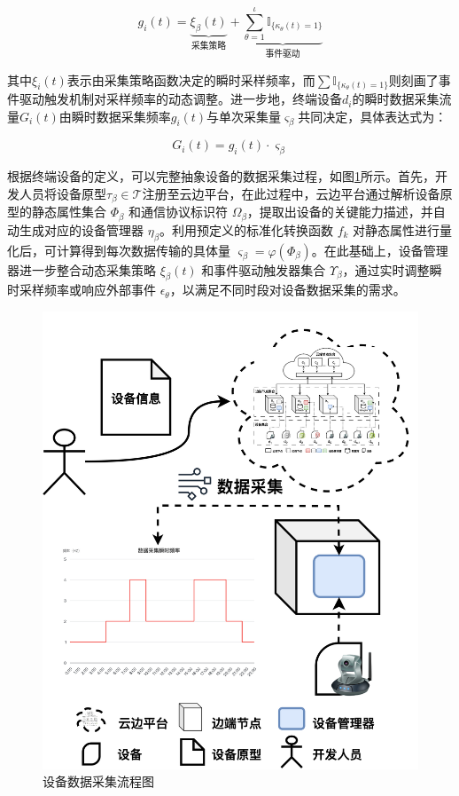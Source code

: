 \begin{equation}
g_i(t) = \underbrace{\xi_\beta(t)}_{\text{采集策略}} + \underbrace{\sum_{\theta=1}^{\iota} \mathbb{I}_{\{\kappa_\theta(t)=1\}}}_{\text{事件驱动}}
\end{equation}

其中$\xi_i(t)$表示由采集策略函数决定的瞬时采样频率，而$\sum \mathbb{I}_{\{\kappa_\theta(t)=1\}}$则刻画了事件驱动触发机制对采样频率的动态调整。进一步地，终端设备$d_i$的瞬时数据采集流量$G_i(t)$由瞬时数据采集频率$g_i(t)$与单次采集量$\varsigma_\beta$共同决定，具体表达式为：

\begin{equation}
G_i(t) = g_i(t) \cdot \varsigma_\beta
\end{equation}

根据终端设备的定义，可以完整抽象设备的数据采集过程，如图\ref{fig:3-3device}所示。首先，开发人员将设备原型$\tau_\beta \in \mathcal{T}$注册至云边平台，在此过程中，云边平台通过解析设备原型的静态属性集合 $\Phi_\beta$ 和通信协议标识符 $\Omega_\beta$，提取出设备的关键能力描述，并自动生成对应的设备管理器 $\eta_\beta$。利用预定义的标准化转换函数 $f_k$ 对静态属性进行量化后，可计算得到每次数据传输的具体量 $\varsigma_\beta = \varphi(\Phi_\beta)$。在此基础上，设备管理器进一步整合动态采集策略 $\xi_\beta(t)$ 和事件驱动触发器集合 $\Upsilon_\beta$，通过实时调整瞬时采样频率或响应外部事件 $\epsilon_\theta$，以满足不同时段对设备数据采集的需求。

\begin{figure}[h]
  \centering
  \includegraphics[width=0.55\linewidth]{pics/3-3设备模型.png}
  \caption{设备数据采集流程图}
  \label{fig:3-3device}
\end{figure}

